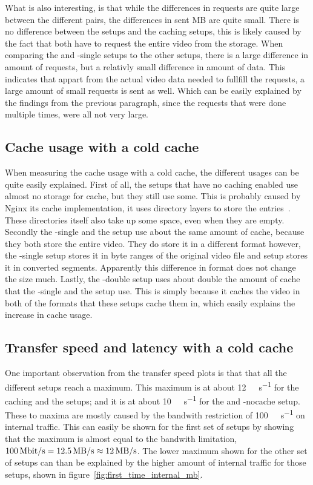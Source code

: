 \documentclass[twoside,openright]{uva-bachelor-thesis}
\newcommand{\mbps}[1]{\SI[per-mode=symbol]{#1}{\mega\bit\per\second}}
\newcommand{\Mbps}[1]{\SI[per-mode=symbol]{#1}{\mega\byte\per\second}}
\begin{document}
What is also interesting, is that while the differences in requests are quite
large between the different pairs, the differences in sent MB are quite small.
There is no difference between the \cdn setups and the caching \lt setups, this
is likely caused by the fact that both have to request the entire video from the
storage. When comparing the \ipp and \lt-single setups to the other setups,
there is a large difference in amount of requests, but a relativly small
difference in amount of data. This indicates that appart from the actual video
data needed to fullfill the requests, a large amount of small requests is sent
as well.  Which can be easily explained by the findings from the previous
paragraph, since the requests that were done multiple times, were all not very
large.

\subsection{Cache usage with a cold cache}
When measuring the cache usage with a cold cache, the different usages can be
quite easily explained. First of all, the setups that have no caching enabled
use almost no storage for cache, but they still use some. This is probably
caused by Nginx its cache implementation, it uses directory layers to store the
entries~\autocite{nginxcachelevels}. These directories itself also take up some
space, even when they are empty. Secondly the \lt-single and the \cdn setup use
about the same amount of cache, because they both store the entire video. They
do store it in a different format however, the \lt-single setup stores it in
byte ranges of the original video file and \cdn setup stores it in converted segments.
Apparently this difference in format does not change the size much. Lastly, the
\lt-double setup uses about double the amount of cache that the \lt-single and
the \cdn setup use. This is simply because it caches the video in both of the
formats that these setups cache them in, which easily explains the increase in
cache usage.

\subsection{Transfer speed and latency with a cold cache}
One important observation from the transfer speed plots is that that all the
different setups reach a maximum. This maximum is at about \Mbps{12} for the
caching \lt and the \cdn setups; and it is at about \Mbps{10} for the
\ipp and \lt-nocache setup. These to maxima are mostly caused by the bandwith
restriction of \mbps{100} on internal traffic. This can easily be shown for the
first set of setups by showing that the maximum is almost equal to the bandwith
limitation, $\mbps{100} = \Mbps{12.5} \approx
\Mbps{12}$. The lower maximum shown for the other set of setups can than be
explained by the higher amount of internal traffic for those setups, shown in
figure~\ref{fig:first_time_internal_mb}.
\end{document}
